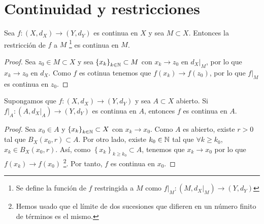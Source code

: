 \section{Continuidad y restricciones}
\begin{prop}
Sea $\displaystyle f : \left(X,d _{X}\right) \to \left(Y, d _{Y}\right) $ es continua en $\displaystyle X $ y sea $\displaystyle M \subset X $. Entonces la restricción de $\displaystyle f $ a $\displaystyle M $ \footnote{Se define la función de $\displaystyle f $ restringida a $\displaystyle M $ como $\displaystyle f|_{M}:\left(M, d _{X}|_{M}\right) \to \left(Y, d _{Y}\right) $} es continua en $\displaystyle M $. 
\end{prop}
\begin{proof}
	Sea $\displaystyle z_{0} \in M \subset X $ y sea $\displaystyle \left\{ x_{k}\right\} _{k \in \mathbb{N}} \subset M $ con $\displaystyle x_{k} \to z_{0} $ en $\displaystyle d _{X} |_{M} $, por lo que $\displaystyle x_{k} \to z_{0} $ en $\displaystyle d _{X} $. Como $\displaystyle f $ es cotinua tenemos que $\displaystyle f\left(x_{k}\right) \to f\left(z_{0}\right) $, por lo que $\displaystyle f|_{M} $ es continua en $\displaystyle z_{0} $.
\end{proof}
\begin{prop}
Supongamos que $\displaystyle f : \left(X, d _{X}\right) \to \left(Y, d _{Y}\right) $ y sea $\displaystyle A \subset X $ abierto. Si $\displaystyle f|_{A} : \left(A, d _{X}|_{A}\right) \to \left(Y, d _{Y}\right) $ es continua en $\displaystyle A $, entonces $\displaystyle f $ es continua en $\displaystyle A $.
\end{prop}
\begin{proof}
	Sea $\displaystyle x_{0} \in A $ y $\displaystyle \left\{ x_{k}\right\} _{k \in \mathbb{N}} \subset X $ con $\displaystyle x_{k} \to x_{0} $. Como $\displaystyle A $ es abierto, existe $\displaystyle r > 0 $ tal que $\displaystyle B_{X}\left(x_{0},r\right) \subset A $. Por otro lado, existe $\displaystyle k_{0} \in \mathbb{N} $ tal que $\displaystyle \forall k \geq k_{0} $, $\displaystyle x_{k} \in B_{X}\left(x_{0}, r\right) $.
	Así, como $\displaystyle \left\{ x_{k}\right\}_{k \geq k_{0}} \subset A $, tenemos que $\displaystyle x_{k} \to x_{0} $ por lo que $\displaystyle f\left(x_{k}\right) \to f\left(x_{0}\right) $ \footnote{Hemos usado que el límite de dos sucesiones que difieren en un número finito de términos es el mismo.}. Por tanto, $\displaystyle f $ es continua en $\displaystyle x_{0} $.
\end{proof}
